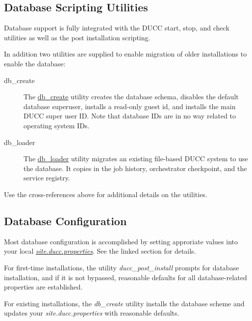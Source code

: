\subsection{Database Scripting  Utilities}
    Database support is fully integrated with the DUCC start, stop, and check utilities as
    well as the post installation scripting.

    In addition two utilities are supplied to enable migration of older installations to
    enable the database:

    \begin{description}
      \item[db\_create] The \hyperref[subsec:cli.db.create]{db\_create} utility creates the database schema, disables the
        default database superuser, installs a read-only guest id, and installs the
        main DUCC super user ID.  Note that database IDs are in no way related to 
        operating system IDs.
      \item[db\_loader] The \hyperref[subsec:cli.db.loader]{db\_loader} utility migrates an existing file-based DUCC
        system to use the database.  It copies in the job history, orchestrator checkpoint,
        and the service registry.
    \end{description}
      
    Use the cross-references above for additional details on the utilities.
    
\subsection{Database Configuration}
    Most database configuration is accomplished by setting approriate values into 
    your local \hyperref[subsec:ducc.database.properties]{\em site.ducc.properties}.  See
    the linked section for details.
    
    For first-time installations, the utility {\em ducc\_post\_install} prompts
    for database installation, and if it is not bypassed, reasonable defaults for
    all database-related properties are established.

    For existing installations, the {\em db\_create} utility installs the
    database scheme and updates your {\em site.ducc.properties} with reasonable
    defaults.
